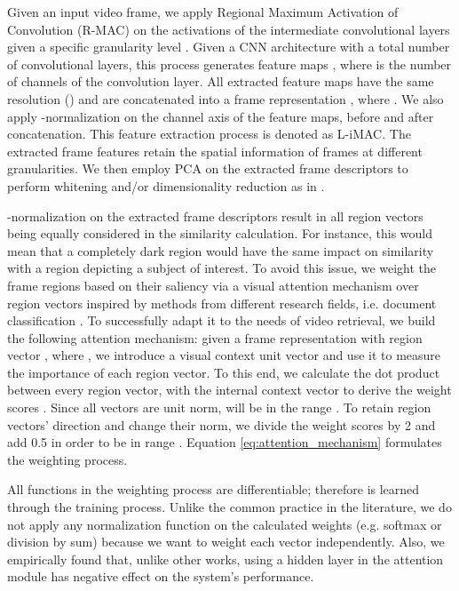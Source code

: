 \documentclass[10pt,twocolumn,letterpaper]{article}
\begin{document}
Given an input video frame, we apply Regional Maximum Activation of Convolution (R-MAC) \cite{tolias2015} on the activations of the intermediate convolutional layers \cite{kordopatis2017a} given a specific granularity level . Given a CNN architecture with a total number of  convolutional layers, this process generates  feature maps , where  is the number of channels of the  convolution layer. All extracted feature maps have the same resolution () and are concatenated into a frame representation , where . We also apply -normalization on the channel axis of the feature maps, before and after  concatenation. This feature extraction process is denoted as L-iMAC. The extracted frame features retain the spatial information of frames at different granularities. We then employ PCA on the extracted frame descriptors to perform whitening and/or dimensionality reduction as in \cite{jegou2012}. 



-normalization on the extracted frame descriptors result in all region vectors being equally considered in the similarity calculation. For instance, this would mean that a completely dark region would have the same impact on similarity with a region depicting a subject of interest. To avoid this issue, we weight the frame regions based on their saliency via a visual attention mechanism over region vectors inspired by methods from different research fields, i.e. document classification \cite{yang2016}. To successfully adapt it to the needs of video retrieval, we build the following attention mechanism: given a frame representation  with region vector , where , we introduce a visual context unit vector  and use it to measure the importance of each region vector. To this end, we calculate the dot product between every  region vector, with the internal context vector  to derive the weight scores . Since all vectors are unit norm,  will be in the range . To retain region vectors' direction and change their norm, we divide the weight scores  by 2 and add 0.5 in order to be in range . Equation \ref{eq:attention_mechanism} formulates the weighting process.




All functions in the weighting process are differentiable; therefore  is learned through the training process. Unlike the common practice in the literature, we do not apply any normalization function on the calculated weights (e.g. softmax or division by sum) because we want to weight each vector independently. Also, we empirically found that, unlike other works, using a hidden layer in the attention module has negative effect on the system's performance.
\end{document}
